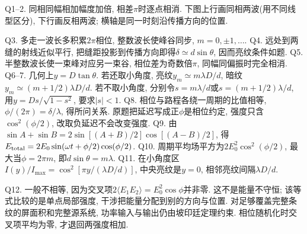 \begin{solution}
Q1--2. 同相同幅相加幅度加倍, 相差$\pi$时逐点相消. 下图上行画同相两波(用不同线型区分), 下行画反相两波; 横轴是同一时刻沿传播方向的位置.
\begin{center}
\end{center}
Q3. 多走一波长多积累$2\pi$相位, 整数波长使峰谷同步, $m=0,\pm1,\ldots$.
Q4. 远处到两缝的射线近似平行, 把缝距投影到传播方向即得$\delta\simeq d\sin\theta$, 因而亮纹条件如题.
Q5. 半整数波长使一束峰对应另一束谷, 相位差为奇数倍$\pi$, 同幅同偏振时完全相消.
Q6--7. 几何上$y=D\tan\theta$. 若还取小角度, 亮纹$y_m\simeq m\lambda D/d$, 暗纹$y_m\simeq(m+1/2)\lambda D/d$. 若不取小角度, 分别令$s=m\lambda/d$或$s=(m+1/2)\lambda/d$, 用$y=Ds/\sqrt{1-s^2}$, 要求$|s|<1$.
Q8. 相位与路程各绕一周期的比值相等,$\phi/(2\pi)=\delta/\lambda$, 得所问关系. 原题把延迟写成正$\phi$是相位约定, 强度只含$\cos^2(\phi/2)$, 改取负延迟不会改变强度.
Q9. 由$\sin A+\sin B=2\sin[(A+B)/2]\cos[(A-B)/2]$, 得$E_{\rm total}=2E_0\sin(\omega t+\phi/2)\cos(\phi/2)$.
Q10. 周期平均场平方为$2E_0^2\cos^2(\phi/2)$, 最大当$\phi=2\pi m$, 即$d\sin\theta=m\lambda$.
Q11. 在小角度区$I(y)/I_{\max}=\cos^2[\pi y/(\lambda D/d)]$, 中央亮纹是$y=0$, 相邻亮纹间隔$\lambda D/d$.
\begin{center}\end{center}
Q12. 一般不相等, 因为交叉项$2\langle E_1E_2\rangle=E_0^2\cos\phi$并非零. 这不是能量不守恒; 该等式比较的是单点局部强度, 干涉把能量分配到别的方向与位置. 对足够覆盖完整条纹的屏面积和完整源系统, 功率输入与输出仍由坡印廷定理约束. 相位随机化时交叉项平均为零, 才退回两强度相加.
\end{solution}
